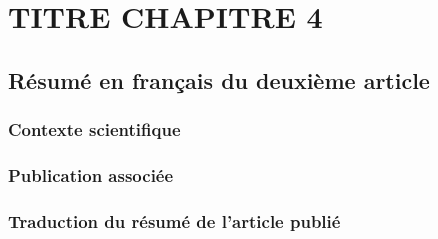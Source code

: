 \chapter{TITRE CHAPITRE 4}
\label{chap4}

\section{Résumé en français du deuxième article}

\subsection{Contexte scientifique}

\subsection{Publication associée}

\subsection{Traduction du résumé de l'article publié}

